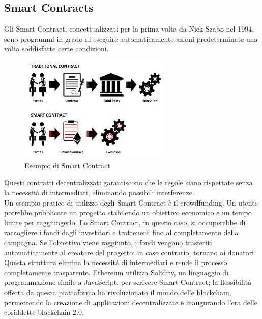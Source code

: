 \subsection{Smart Contracts}
Gli Smart Contract, concettualizzati per la prima volta da Nick Szabo nel 1994, sono programmi in grado di eseguire automaticamente azioni predeterminate una volta soddisfatte certe condizioni.
\begin{figure}[h]
    \centering
    \includegraphics[width=0.65\textwidth]{Immagini/smart-contract.png}
    \caption{Esempio di Smart Contract}
\end{figure}
Questi contratti decentralizzati garantiscono che le regole siano rispettate senza la necessità di intermediari, eliminando possibili interferenze.
\\Un esempio pratico di utilizzo degli Smart Contract è il crowdfunding. Un utente potrebbe pubblicare un progetto stabilendo un obiettivo economico e un tempo limite per raggiungerlo. Lo Smart Contract, in questo caso, si occuperebbe di raccogliere i fondi dagli investitori e trattenerli fino al completamento della campagna. Se l’obiettivo viene raggiunto, i fondi vengono trasferiti automaticamente al creatore del progetto; in caso contrario, tornano ai donatori. 
\\Questa struttura elimina la necessità di intermediari e rende il processo completamente trasparente.
Ethereum utilizza Solidity, un linguaggio di programmazione simile a JavaScript, per scrivere Smart Contract; la flessibilità offerta da questa piattaforma ha rivoluzionato il mondo delle blockchain, permettendo la creazione di applicazioni decentralizzate e inaugurando l’era delle cosiddette blockchain 2.0.

